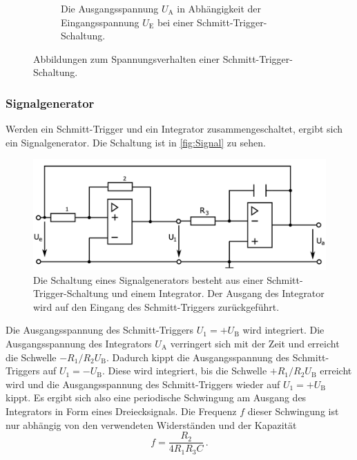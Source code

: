 \begin{figure}
\begin{subfigure}{0.48\textwidth}
        \caption{Die Ausgangsspannung $U_\text{A}$ in Abhängigkeit der Eingangsspannung $U_\text{E}$ bei einer Schmitt-Trigger-Schaltung. \cite{SchmittTrigger}}
        \label{fig:Hysterese}
    \end{subfigure}
    \caption{Abbildungen zum Spannungsverhalten einer Schmitt-Trigger-Schaltung.}
    \label{fig:Abbildung}
\end{figure}

\subsubsection{Signalgenerator}
Werden ein Schmitt-Trigger und ein Integrator zusammengeschaltet, ergibt sich ein Signalgenerator. Die Schaltung ist in \autoref{fig:Signal} zu sehen.

\begin{figure}
    \centering
    \includegraphics[width=0.7\linewidth]{./figures/5_Signal.png}
    \caption{Die Schaltung eines Signalgenerators besteht aus einer Schmitt-Trigger-Schaltung und einem Integrator. Der Ausgang des Integrator wird auf den Eingang des Schmitt-Triggers zurückgeführt. \cite{V51}}
    \label{fig:Signal}
\end{figure}

Die Ausgangsspannung des Schmitt-Triggers $U_1 = + U_\text{B}$ wird integriert. Die Ausgangsspannung des Integrators $U_\text{A}$ verringert sich mit der Zeit und erreicht die Schwelle $- R_1/R_2 U_\text{B}$. Dadurch kippt die Ausgangsspannung des Schmitt-Triggers auf $U_1 = - U_\text{B}$. Diese wird integriert, bis die Schwelle $+ R_1/R_2 U_\text{B}$ erreicht wird und die Ausgangsspannung des Schmitt-Triggers wieder auf $U_1 = + U_\text{B}$ kippt. Es ergibt sich also eine periodische Schwingung am Ausgang des Integrators in Form eines Dreiecksignals. Die Frequenz $f$ dieser Schwingung ist nur abhängig von den verwendeten Widerständen und der Kapazität
\begin{equation}
    f = \frac{R_2}{4 R_1 R_3 C} \, .
    \label{eq:Frequenz}
\end{equation}









